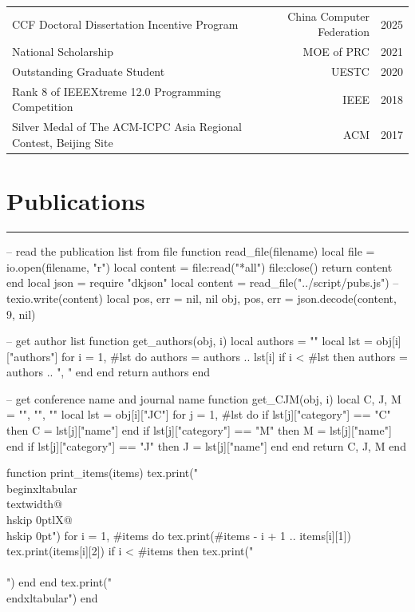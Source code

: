 \documentclass{article}
\begin{document}
\begin{tabularx}{\textwidth}{@{\hskip 0pt}lXr@{\hskip 1em}r@{\hskip 0pt}}
  CCF Doctoral Dissertation Incentive Program & & China Computer Federation & 2025 \\
  National Scholarship & & MOE of PRC & 2021  \\
  Outstanding Graduate Student & & UESTC & 2020 \\
  Rank 8 of IEEEXtreme 12.0 Programming Competition & & IEEE & 2018 \\
  Silver Medal of The ACM-ICPC Asia Regional Contest, Beijing Site & & ACM & 2017
\end{tabularx}

\section*{Publications}
\vspace{-1em} \hrule \vspace{1em}

\begin{luacode}
  -- read the publication list from file
  function read_file(filename)
    local file = io.open(filename, "r")
    local content = file:read("*all")
    file:close()
    return content
  end
  local json = require "dkjson"
  local content = read_file("../script/pubs.js")
  -- texio.write(content)
  local pos, err = nil, nil
  obj, pos, err = json.decode(content, 9, nil)
\end{luacode}


\begin{luacode}
  -- get author list
  function get_authors(obj, i) 
    local authors = ""
    local lst = obj[i]["authors"]
    for i = 1, #lst do
      authors = authors .. lst[i]
      if i < #lst then
        authors = authors .. ", "
      end
    end
    return authors
  end

  -- get conference name and journal name
  function get_CJM(obj, i)
    local C, J, M = "", "", "" 
    local lst = obj[i]["JC"]
    for j = 1, #lst do
      if lst[j]["category"] == "C" then
        C = lst[j]["name"]
      end
      if lst[j]["category"] == "M" then
        M = lst[j]["name"]
      end
      if lst[j]["category"] == "J" then
        J = lst[j]["name"]
      end
    end
    return C, J, M
  end

  function print_items(items)
    tex.print("\\begin{xltabular}{\\textwidth}{@{\\hskip 0pt}lX@{\\hskip 0pt}}")
    for i = 1, #items do
      tex.print(#items - i + 1 .. items[i][1])
      tex.print(items[i][2])
      if i < #items then
        tex.print("\\\\")
      end
    end
    tex.print("\\end{xltabular}")
  end
\end{luacode}
\end{document}
